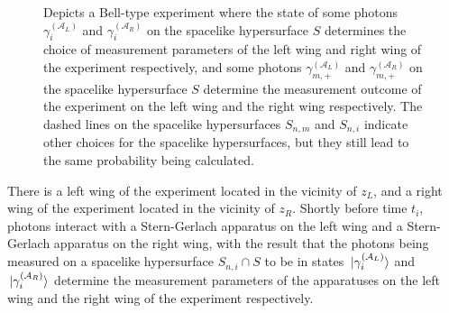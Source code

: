 \begin{figure}[ht!]
	
	\vspace*{2px}
	\caption{Depicts a Bell-type experiment where the state of some photons $\gamma_i^{(\mathcal{A}_L)}$ and $\gamma_i^{(\mathcal{A}_R)}$ on the spacelike hypersurface $S$ determines the choice of measurement parameters of the left wing and right wing of the experiment respectively, and some photons $\gamma_{m,+}^{(\mathcal{A}_L)}$ and $\gamma_{m,+}^{(\mathcal{A}_R)}$ on the spacelike hypersurface $S$ determine the measurement outcome of the experiment on the left wing and the right wing respectively. The dashed lines on the spacelike hypersurfaces $S_{n,m}$ and $S_{n,i}$ indicate other choices for the spacelike hypersurfaces, but they still lead to the same probability being calculated.   }
	\label{bellsolution}
	\end{figure}
There is a left wing of the experiment located in the vicinity of $z_L$, and a right wing of the experiment located in the vicinity of $z_R$. Shortly before time $t_i$, photons interact with a Stern-Gerlach apparatus on the left wing and a Stern-Gerlach apparatus on the right wing, with the result that the photons being measured on a spacelike hypersurface $S_{n,i}\cap S$ to be in states $\ket*{\gamma_i^{(\mathcal{A}_L)}}$ and $\ket*{\gamma_i^{(\mathcal{A}_R)}}$ determine the measurement parameters of the apparatuses on the left wing and the right wing of the experiment respectively. 

